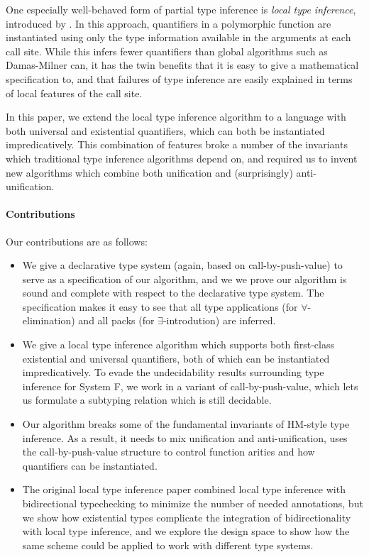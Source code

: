 One especially well-behaved form of partial type inference is \emph{local type inference}, introduced by \citet{pierce-local-2000}. In this approach, quantifiers in a polymorphic function are instantiated using only the type information available in the arguments at each call site. While this infers fewer quantifiers than global algorithms such as Damas-Milner can, it has the twin benefits that it is easy to give a mathematical specification to, and that failures of type inference are easily explained in terms of local features of the call site.

In this paper, we extend the local type inference algorithm to a language with both universal and existential quantifiers, which can both be instantiated impredicatively. This combination of features broke a number of the invariants which traditional type inference algorithms depend on, and required us to invent new algorithms which combine both unification and (surprisingly) anti-unification. 


\paragraph{Contributions} Our contributions are as follows: 
\begin{itemize}
\item We give a declarative type system (again, based on call-by-push-value) to serve as a specification of our algorithm, and we we prove our algorithm is sound and complete with respect to the declarative type system. The specification makes it easy to see that all type applications (for $\forall$-elimination) and all packs (for $\exists$-introdution) are inferred. 

\item We give a local type inference algorithm which supports both first-class existential and universal quantifiers, both of which can be instantiated impredicatively. To evade the undecidability results surrounding type inference for System F, we work in a variant of call-by-push-value, which lets us formulate a subtyping relation which is still decidable. 


\item Our algorithm breaks some of the fundamental invariants of
  HM-style type inference. As a result, it needs to mix unification
  and anti-unification, uses the call-by-push-value structure to
  control function arities and how quantifiers can be instantiated. 

\item The original local type inference paper combined local type inference
  with bidirectional typechecking to minimize the number of needed
  annotations, but we show how existential types complicate the integration
  of bidirectionality with local type inference, and we explore the design space
  to show how the same scheme could be applied to work with different
  type systems. 
\end{itemize}





